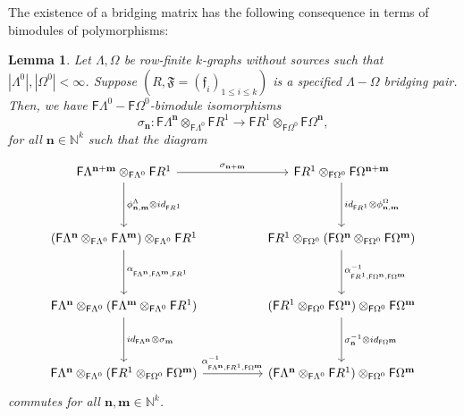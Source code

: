 \documentclass[12pt]{amsart}
\newcommand{\N}{\mathbf{n}}
\newcommand{\M}{\mathbf{m}}
\newtheorem{lem}[thm]{Lemma}
\theoremstyle{definition}
\theoremstyle{remark}
\begin{document}
The existence of a bridging matrix has the following consequence in terms of bimodules of polymorphisms: 
\begin{lem}\label{lem towards specified conjugacy}
Let $\Lambda,\Omega$ be row-finite $k$-graphs without sources such that $|\Lambda^0|,|\Omega^0|< \infty$. Suppose $(R,\mathfrak{F}=(\mathfrak{f}_i)_{1\le i\le k})$ is a specified $\Lambda-\Omega$ bridging pair. Then, we have $\mathsf{F}\Lambda^0-\mathsf{F}\Omega^0$-bimodule isomorphisms
\[\sigma_\N:\mathsf{F}\Lambda^\N\otimes_{\mathsf{F}\Lambda^0}\mathsf{F}R^1\longrightarrow \mathsf{F}R^1\otimes_{\mathsf{F}\Omega^0}\mathsf{F}\Omega^\N,\]
for all $\N\in \mathbb{N}^k$ such that the diagram 

\begin{equation}\label{comd4}
\begin{tikzcd}[row sep=huge, column sep=huge]
        \mathsf{F}\Lambda^{\N+\M}\otimes_{\mathsf{F}\Lambda^0}\mathsf{F}R^1 \arrow [r, "\sigma_{\N+\M}"] \arrow [d, "\phi_{\N,\M}^\Lambda\otimes id_{\mathsf{F}R^1}"] & \mathsf{F}R^1\otimes_{\mathsf{F}\Omega^0}\mathsf{F}\Omega^{\N+\M} \arrow [d, "id_{\mathsf{F}R^1}\otimes \phi_{\N,\M}^\Omega"] \\	(\mathsf{F}\Lambda^\N\otimes_{\mathsf{F}\Lambda^0}\mathsf{F}\Lambda^\M)\otimes_{\mathsf{F}\Lambda^0}\mathsf{F}R^1 \arrow [d, "\alpha_{_{\mathsf{F}\Lambda^\N,\mathsf{F}\Lambda^\M,\mathsf{F}R^1}}"] & \mathsf{F}R^1\otimes_{\mathsf{F}\Omega^0}(\mathsf{F}\Omega^\N\otimes_{\mathsf{F}\Omega^0}\mathsf{F}\Omega^\M) \arrow [d, "\alpha_{_{\mathsf{F}R^1,\mathsf{F}\Omega^\N,\mathsf{F}\Omega^\M}}^{-1}"]\\
        \mathsf{F}\Lambda^\N\otimes_{\mathsf{F}\Lambda^0}(\mathsf{F}\Lambda^\M\otimes_{\mathsf{F}\Lambda^0}\mathsf{F}R^1) \arrow [d, "id_{\mathsf{F}\Lambda^\N}\otimes \sigma_\M"] & (\mathsf{F}R^1\otimes_{\mathsf{F}\Omega^0}\mathsf{F}\Omega^\N)\otimes_{\mathsf{F}\Omega^0}\mathsf{F}\Omega^\M \arrow [d, "\sigma_\N^{-1}\otimes id_{\mathsf{F}\Omega^\M}"]\\
        \mathsf{F}\Lambda^\N\otimes_{\mathsf{F}\Lambda^0}(\mathsf{F}R^1\otimes_{\mathsf{F}\Omega^0}\mathsf{F}\Omega^\M) \arrow [r,"\alpha_{_{\mathsf{F}\Lambda^\N,\mathsf{F}R^1,\mathsf{F}\Omega^\M}}^{-1}"] & (\mathsf{F}\Lambda^\N\otimes_{\mathsf{F}\Lambda^0}\mathsf{F}R^1)\otimes_{\mathsf{F}\Omega^0}\mathsf{F}\Omega^\M       
\end{tikzcd}
\end{equation}
commutes for all $\N,\M\in \mathbb{N}^k$. 
\end{lem}
\end{document}
